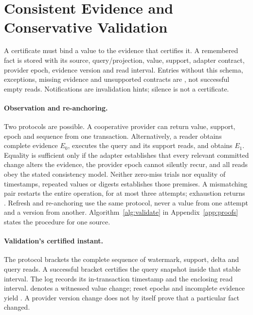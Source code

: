 \section{Consistent Evidence and Conservative Validation}
\label{sec:design}
A certificate must bind a value to the evidence that certifies it. A remembered fact is stored with its source, query/projection, value, support, adapter contract, provider epoch, evidence version and read interval. Entries without this schema, exceptions, missing evidence and unsupported contracts are \Unknown, not successful empty reads. Notifications are invalidation hints; silence is not a certificate.

\paragraph{Observation and re-anchoring.} Two protocols are possible. A cooperative provider can return value, support, epoch and sequence from one transaction. Alternatively, a reader obtains complete evidence $E_0$, executes the query and its support reads, and obtains $E_1$. Equality is sufficient only if the adapter establishes that every relevant committed change alters the evidence, the provider epoch cannot silently recur, and all reads obey the stated consistency model. Neither zero-miss trials nor equality of timestamps, repeated values or digests establishes those premises. A mismatching pair restarts the entire operation, for at most three attempts; exhaustion returns \Unknown. Refresh and re-anchoring use the same protocol, never a value from one attempt and a version from another. Algorithm~\ref{alg:validate} in Appendix~\ref{app:proofs} states the procedure for one source.

\paragraph{Validation's certified instant.} The protocol brackets the complete sequence of watermark, support, delta and query reads. A successful bracket certifies the query snapshot inside that stable interval. The log records its in-transaction timestamp and the enclosing read interval. \Changed denotes a witnessed value change; reset epochs and incomplete evidence yield \Unknown. A provider version change does not by itself prove that a particular fact changed.

